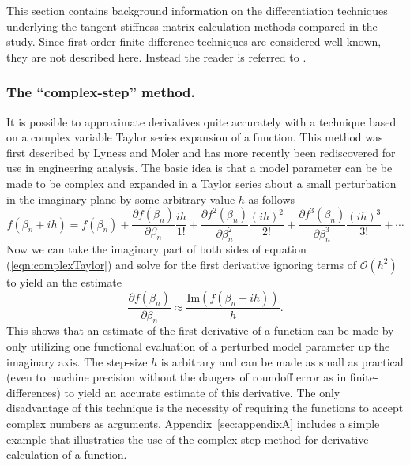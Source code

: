 \documentclass[preprint,12pt]{elsarticle}
\begin{document}
This section contains background information on the differentiation techniques underlying the tangent-stiffness matrix calculation methods compared in the study. Since first-order finite difference techniques are considered well known, they are not described here. Instead the reader is referred to \cite[Chap. 4.1.3]{chapra2010}.

\subsubsection{The ``complex-step'' method.}  
It is possible to approximate derivatives quite accurately with a technique based on a complex variable Taylor series expansion of a function.  This method was first described by Lyness and Moler \cite{lyness1967numerical, lyness1968differentiation} and has more recently been rediscovered \cite{squire1998using, voorhees2011complex, al2010complex} for use in engineering analysis.  The basic idea is that a model parameter can be be made to be complex and expanded in a Taylor series about a small perturbation in the imaginary plane by some arbitrary value $h$ as follows
%
\begin{equation}
f ( \beta_n + i h ) = f (\beta_n) + \frac{\partial f( \beta_n )}{\partial \beta_n} \frac{i h}{1!} + \frac{\partial f^2(\beta_n)}{\partial \beta_n^2} \frac{(i h)^2}{2!} + \frac{\partial f^3(\beta_n)}{\partial \beta_n^3} \frac{(i h)^3}{3!} + \cdots
\label{eqn:complexTaylor}
\end{equation}
%
Now we can take the imaginary part of both sides of equation (\ref{eqn:complexTaylor}) and solve for the first derivative ignoring terms of $\mathcal{O}\left ( h^2 \right)$ to yield an the estimate
%
\begin{equation}
 \frac{\partial f( \beta_n )}{\partial \beta_n} \approx \frac{\mbox{Im} \left( f (\beta_n + i h) \right)}{h}.
\label{eqn:complexFirstDeriv}
\end{equation}
%
This shows that an estimate of the first derivative of a function can be made by only utilizing one functional evaluation of a perturbed model parameter up the imaginary axis.  The step-size $h$ is arbitrary and can be made as small as practical (even to machine precision without the dangers of roundoff error as in finite-differences) to yield an accurate estimate of this derivative.  The only disadvantage of this technique is the necessity of requiring the functions to accept complex numbers as arguments. Appendix~\ref{sec:appendixA} includes a simple example that illustraties the use of the complex-step method for derivative calculation of a function. 
\end{document}
